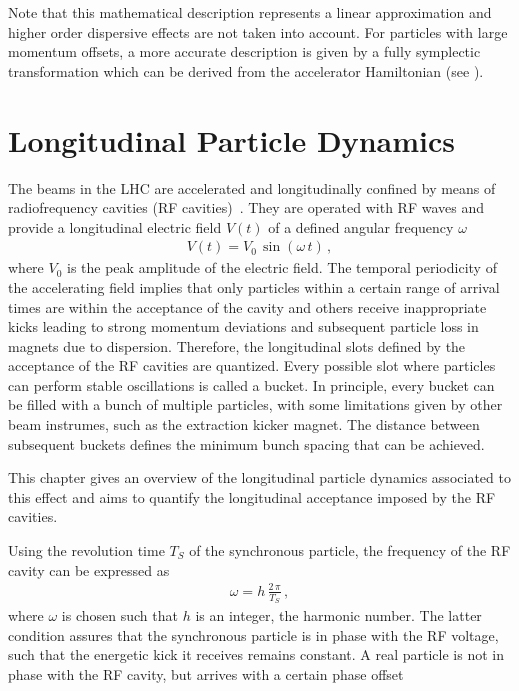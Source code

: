 Note that this mathematical description represents a linear approximation and higher order dispersive effects are not taken into account. For particles with large momentum offsets, a more accurate description is given by a fully symplectic transformation which can be derived from the accelerator Hamiltonian (see ). 



\section{Longitudinal Particle Dynamics}



The beams in the LHC are accelerated and longitudinally confined by means of radiofrequency cavities (RF cavities)~\cite{wiedemann1999particle}. They are operated with RF waves and provide a longitudinal electric field $V(t)$ of a defined angular frequency $\omega$ 
%
\begin{align}
  V(t) = V_0 \, \sin (\omega \, t) \, ,
\end{align}
%
where $V_0$ is the peak amplitude of the electric field. The temporal periodicity of the accelerating field implies that only particles within a certain range of arrival times are within the acceptance of the cavity and others receive inappropriate kicks leading to strong momentum deviations and subsequent particle loss in magnets due to dispersion. Therefore, the longitudinal slots defined by the acceptance of the RF cavities are quantized. Every possible slot where particles can perform stable oscillations is called a bucket. In principle, every bucket can be filled with a bunch of multiple particles, with some limitations given by other beam instrumes, such as the extraction kicker magnet. The distance between subsequent buckets defines the minimum bunch spacing that can be achieved. 

This chapter gives an overview of the longitudinal particle dynamics associated to this effect and aims to quantify the longitudinal acceptance imposed by the RF cavities. 





Using the revolution time $T_S$ of the synchronous particle, the frequency of the RF cavity can be expressed as
\begin{align}
  \omega = h \, \frac{2 \, \pi}{T_S} \, ,
\end{align}
where $\omega$ is chosen such that $h$ is an integer, the harmonic number. The latter condition assures that the synchronous particle is in phase with the RF voltage, such that the energetic kick it receives remains constant. A real particle is not in phase with the RF cavity, but arrives with a certain phase offset
%






